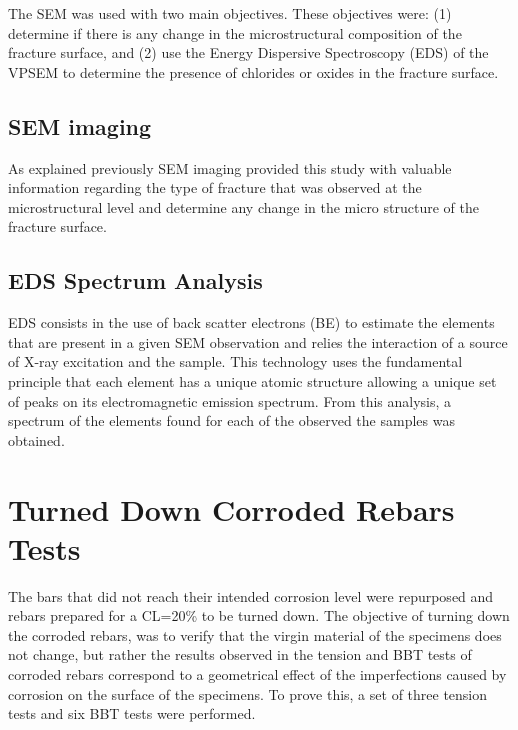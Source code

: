 The SEM was used with two main objectives. These objectives were: (1) determine if there is any change in the microstructural composition of the fracture surface, and (2) use the Energy Dispersive Spectroscopy (EDS) of the VPSEM to determine the presence of chlorides or oxides in the fracture surface. 

\subsection{SEM imaging}
As explained previously SEM imaging provided this study with valuable information regarding the type of fracture that was observed at the microstructural level and determine any change in the micro structure of the fracture surface.

\subsection{EDS Spectrum Analysis}

EDS consists in the use of back scatter electrons (BE) to estimate the elements that are present in a given SEM observation and relies the interaction of a source of X-ray excitation and the sample. This technology uses the fundamental principle that each element has a unique atomic structure allowing a unique set of peaks on its electromagnetic emission spectrum. From this analysis, a spectrum of the elements found for each of the observed the samples was obtained. 

\section{Turned Down Corroded Rebars Tests}

The bars that did not reach their intended corrosion level were repurposed and rebars prepared for a CL=20\% to be turned down. The objective of turning down the corroded rebars, was to verify that the virgin material of the specimens does not change, but rather the results observed in the tension and BBT tests of corroded rebars correspond to a geometrical effect of the imperfections caused by corrosion on the surface of the specimens. To prove this, a set of three tension tests and six BBT tests were performed.


